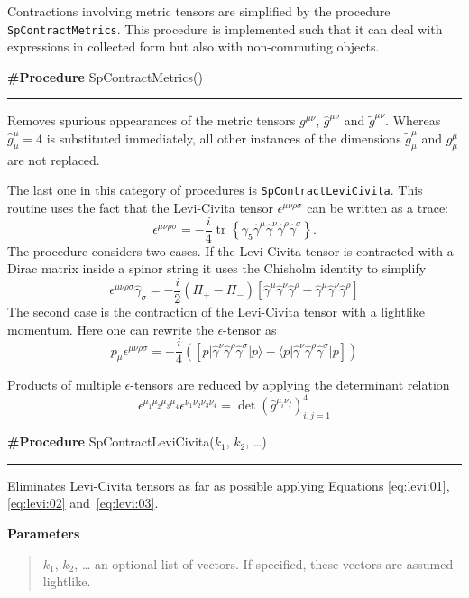 \documentclass[preprint,number,12pt,sort&compress]{elsarticle}
\DeclareMathOperator{\Trace}{tr}
\newcommand{\tr}[2][{}]{\Trace^{#1}\!\left\{{#2}\right\}}
\newcommand{\Spab}[1]{\langle #1]}
\newcommand{\Spba}[1]{[ #1 \rangle}
\newlength{\funcindent}
\newlength{\funcwidth}
\newenvironment{Ventry}[1]%
 {\begin{list}{}{%
   \renewcommand{\makelabel}[1]{\texttt{##1:}\hfil}%
   \settowidth{\labelwidth}{\texttt{#1:}}%
   \setlength{\leftmargin}{\labelsep}%
   \addtolength{\leftmargin}{\labelwidth}}}%
 {\end{list}}
\newenvironment{Procedure}[2]{%
\hspace{.8\funcindent}\begin{boxedminipage}{\funcwidth}
	\raggedright \textbf{\#Procedure} #1(#2)

	\vspace{-1.5ex}

	\rule{\textwidth}{0.5\fboxrule}
	\setlength{\parskip}{2ex}
}{\end{boxedminipage}}
\newenvironment{Parameters}{%
	\setlength{\parskip}{1ex}
	\textbf{Parameters}
	\vspace{-1ex}
	\begin{quote}}{%
	\end{quote}}
\begin{document}
Contractions involving metric tensors are simplified by
the procedure \texttt{SpContractMetrics}{}. This procedure is
implemented such that it can deal with expressions in collected form
but also with non-commuting objects.

\medskip
\begin{Procedure}{SpContractMetrics}{}
Removes spurious appearances of the metric tensors $g^{\mu\nu}$,
$\hat{g}^{\mu\nu}$ and $\tilde{g}^{\mu\nu}$. Whereas
$\hat{g}^\mu_\mu=4$ is substituted immediately, all other
instances of the dimensions $\tilde{g}^\mu_\mu$ and
$g^\mu_\mu$ are not replaced.
\end{Procedure}
\medskip

The last one in this category of procedures is
\texttt{SpContractLeviCivita}. This routine uses the fact
that the Levi-Civita tensor $\epsilon^{\mu\nu\rho\sigma}$
can be written as a trace:
\begin{equation}
\epsilon^{\mu\nu\rho\sigma}=
-\frac{i}{4}\tr{\gamma_5
\hat{\gamma}^\mu\hat{\gamma}^\nu\hat{\gamma}^\rho\hat{\gamma}^\sigma}\text{.}
\end{equation}
The procedure considers two cases. If the Levi-Civita tensor is contracted
with a Dirac matrix inside a spinor string it uses the
Chisholm identity to simplify
\begin{equation}\label{eq:levi:01}
\epsilon^{\mu\nu\rho\sigma}\hat{\gamma}_\sigma=
-\frac{i}2\left(\Pi_+-\Pi_-\right)\left[
\hat{\gamma}^\mu\hat{\gamma}^\nu\hat{\gamma}^\rho
-\hat{\gamma}^\mu\hat{\gamma}^\nu\hat{\gamma}^\rho\right]
\end{equation}
The second case is the contraction of the Levi-Civita tensor with
a lightlike momentum. Here one can rewrite the $\epsilon$-tensor
as
\begin{equation}\label{eq:levi:02}
p_\mu\epsilon^{\mu\nu\rho\sigma}=
-\frac{i}4\left(
\Spba{p\vert\hat{\gamma}^\nu\hat{\gamma}^\rho\hat{\gamma}^\sigma\vert p}
-\Spab{p\vert\hat{\gamma}^\nu\hat{\gamma}^\rho\hat{\gamma}^\sigma\vert p}
\right)
\end{equation}

Products of multiple $\epsilon$-tensors are reduced by applying
the determinant relation
\begin{equation}\label{eq:levi:03}
\epsilon^{\mu_1\mu_2\mu_3\mu_4}\epsilon^{\nu_1\nu_2\nu_3\nu_4}=
\det{(\hat{g}^{\mu_i\nu_j})_{i,j=1}^4}
\end{equation}

\medskip
\begin{Procedure}{SpContractLeviCivita}{$k_1$, $k_2$, \dots}
   Eliminates Levi-Civita tensors as far as possible applying
	Equations \eqref{eq:levi:01}, \eqref{eq:levi:02}
	and~\eqref{eq:levi:03}.

	\begin{Parameters}
		\begin{Ventry}{$k_1$, $k_2$}
			\item[$k_1$, $k_2$, \dots] an optional list of vectors.
			If specified, these vectors are assumed lightlike.
		\end{Ventry}
	\end{Parameters}

\end{Procedure}
\end{document}
